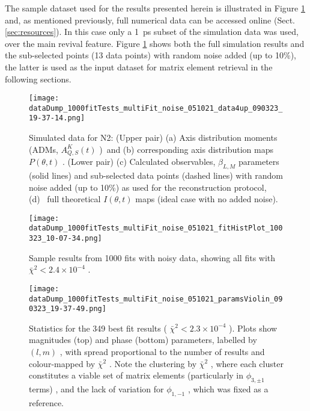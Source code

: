 \documentclass[10pt]{article}
\begin{document}
The sample dataset used for the results presented herein is illustrated in Figure \ref{720080} and, as mentioned previously, full numerical data can be accessed online (Sect. \ref{sec:resources}). In this case only a 1~ps subset of the simulation data was used, over the main revival feature. Figure \ref{720080} shows both the full simulation results and the sub-selected points (13 data points) with random noise added (up to 10\%), the latter is used as the input dataset for matrix element retrieval in the following sections. %




\begin{figure}[]
\begin{center}
\texttt{[image: dataDump\_1000fitTests\_multiFit\_noise\_051021\_data4up\_090323\_19-37-14.png]}
\caption{Simulated data for N2: (Upper pair) (a) Axis distribution moments (ADMs, \(A^{K}_{Q,S}(t)\) ) and (b) corresponding axis distribution maps \(P(\theta, t)\) . (Lower pair) (c) Calculated observables, \(\beta_{L,M}\) parameters (solid lines) and sub-selected data points (dashed lines) with random noise added (up to 10\%) as used for the reconstruction protocol, (d)  full theoretical \(I(\theta,t)\) maps (ideal case with no added noise).\label{720080}}
\end{center}
\end{figure}



\begin{figure}[]
\begin{center}
\texttt{[image: dataDump\_1000fitTests\_multiFit\_noise\_051021\_fitHistPlot\_100323\_10-07-34.png]}
\caption{Sample results from 1000 fits with noisy data, showing all fits with \(\bar{\chi}^2 < 2.4\times10^{-4}\) .\label{509194}}
\end{center}
\end{figure}


\begin{figure}[]
\begin{center}
\texttt{[image: dataDump\_1000fitTests\_multiFit\_noise\_051021\_paramsViolin\_090323\_19-37-49.png]}
\caption{Statistics for the 349 best fit results ( \(\bar{\chi}^2 < 2.3 \times 10^{-4}\) ). Plots show magnitudes (top) and phase (bottom) parameters, labelled by \((l,m)\) , with spread proportional to the number of results and colour-mapped by \(\bar{\chi}^2\) . Note the clustering by \(\bar{\chi}^2\) , where each cluster constitutes a viable set of matrix elements (particularly in \(\phi_{3,\pm1}\) terms) , and the lack of variation for \(\phi_{1,-1}\) , which was fixed as a reference.\label{494229}}
\end{center}
\end{figure}
\end{document}
